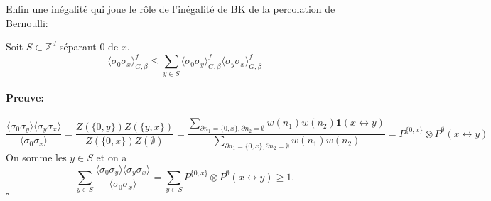 \documentclass[a4paper,12pt]{report}
\newenvironment{preuve}{\paragraph{Preuve:}}{\hfill$\square$}
\begin{document}
Enfin une inégalité qui joue le rôle de l'inégalité de BK de la percolation de Bernoulli:

\begin{prop}
Soit $S\subset \mathbb{Z}^d$ séparant $0$ de $x$.
$$\langle \sigma_0 \sigma_x \rangle_{G,\beta}^f \leqslant \sum_{y\in S}\langle \sigma_0 \sigma_y\rangle_{G,\beta}^f \langle \sigma_y \sigma_x\rangle_{G,\beta}^f
$$
\end{prop}

\begin{preuve}
$$\frac{\langle \sigma_0 \sigma_y \rangle\langle\sigma_y \sigma_x\rangle}{\langle \sigma_0 \sigma_x\rangle} = \frac{Z(\{0,y\})Z(\{y,x\})}{Z(\{0,x\})Z(\emptyset)} = \frac{\sum_{\partial n_1=\{0,x\},\partial n_2= \emptyset} w(n_1)w(n_2)\mathbf{1}(x\leftrightarrow y)}{\sum_{\partial n_1 = \{0,x\},\partial n_2 = \emptyset}w(n_1)w(n_2)} = P^{\{0,x\}}\otimes P^\emptyset(x\leftrightarrow y)
$$
On somme les $y\in S$ et on a 
$$\sum_{y\in S}\frac{\langle \sigma_0 \sigma_y \rangle\langle\sigma_y \sigma_x\rangle}{\langle \sigma_0 \sigma_x\rangle} = \sum_{y\in S}P^{\{0,x\}}\otimes P^\emptyset(x\leftrightarrow y) \geqslant 1.
$$
\end{preuve}
\newpage
\end{document}
